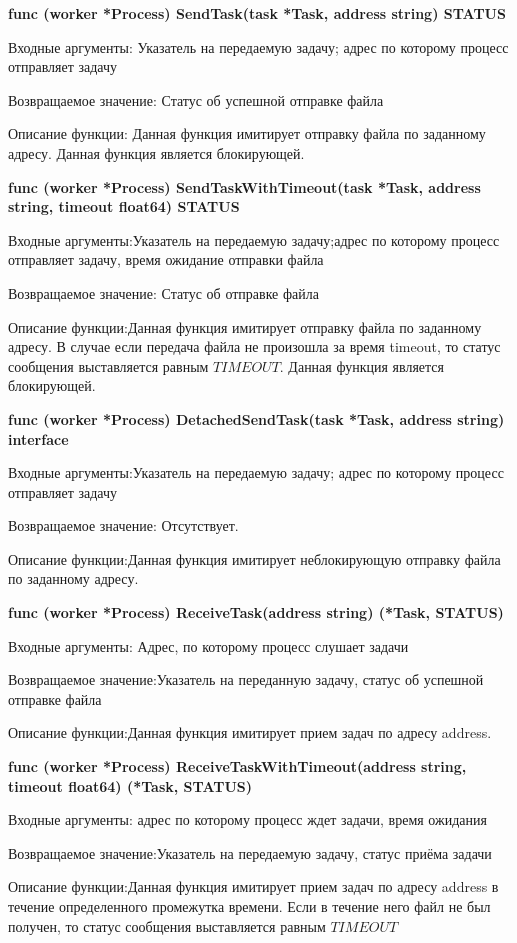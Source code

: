 \textbf{func (worker *Process) SendTask(task *Task, address string) STATUS}

Входные аргументы: Указатель на передаемую задачу; адрес по которому процесс отправляет  задачу

Возвращаемое значение: Статус об успешной отправке файла

Описание функции: Данная функция имитирует отправку файла по заданному адресу. Данная функция является блокирующей. 

\textbf{func (worker *Process) SendTaskWithTimeout(task *Task, address string, timeout float64) STATUS}

Входные аргументы:Указатель на передаемую задачу;адрес по которому процесс отправляет  задачу, время ожидание отправки файла

Возвращаемое значение: Статус об отправке файла

Описание функции:Данная функция имитирует отправку файла по заданному адресу. В случае если передача файла не произошла за время timeout, то статус сообщения выставляется равным $TIMEOUT$. Данная функция является блокирующей. 

\textbf{func (worker *Process) DetachedSendTask(task *Task, address string) interface}


Входные аргументы:Указатель на передаемую задачу; адрес по которому процесс отправляет  задачу

Возвращаемое значение: Отсутствует.

Описание функции:Данная функция имитирует неблокирующую отправку файла по заданному адресу.

\textbf{func (worker *Process) ReceiveTask(address string) (*Task, STATUS) }

Входные аргументы: Адрес, по которому процесс слушает задачи

Возвращаемое значение:Указатель на переданную задачу, статус об успешной отправке файла

Описание функции:Данная функция имитирует прием задач по адресу address.

\textbf{func (worker *Process) ReceiveTaskWithTimeout(address string, timeout float64) (*Task, STATUS) }

Входные аргументы: адрес по которому процесс ждет задачи, время ожидания

Возвращаемое значение:Указатель на передаемую задачу, статус приёма задачи

Описание функции:Данная функция имитирует прием задач по адресу address в течение определенного промежутка времени. Если в течение него файл не был получен, то статус сообщения выставляется равным $TIMEOUT$ 


